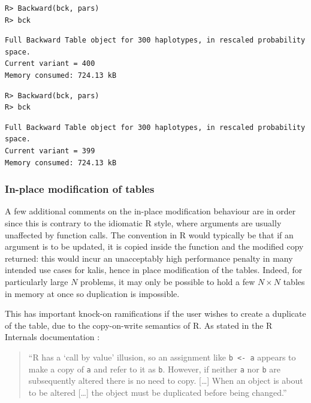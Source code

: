 \documentclass[a4paper]{article}
\let\proglang=\textsf
\newcommand{\pkg}[1]{{\fontseries{m}\fontseries{b}\selectfont #1}}
\begin{document}
\begin{verbatim}
R> Backward(bck, pars)
R> bck
\end{verbatim}
\begin{verbatim}
Full Backward Table object for 300 haplotypes, in rescaled probability space.
Current variant = 400
Memory consumed: 724.13 kB
\end{verbatim}
\begin{verbatim}
R> Backward(bck, pars)
R> bck
\end{verbatim}
\begin{verbatim}
Full Backward Table object for 300 haplotypes, in rescaled probability space.
Current variant = 399
Memory consumed: 724.13 kB
\end{verbatim}



\subsubsection*{In-place modification of tables}
\label{in-place-modification-of-tables}

A few additional comments on the in-place modification behaviour are in order since this is contrary to the idiomatic \proglang{R} style, where arguments are usually unaffected by function calls.
The convention in \proglang{R} would typically be that if an argument is to be updated, it is copied inside the function and the modified copy returned: this would incur an unacceptably high performance penalty in many intended use cases for \pkg{kalis}, hence in place modification of the tables.
Indeed, for particularly large \(N\) problems, it may only be possible to hold a few \(N \times N\) tables in memory at once so duplication is impossible.

This has important knock-on ramifications if the user wishes to create a duplicate of the table, due to the copy-on-write semantics of \proglang{R}.
As stated in the R Internals documentation \cite[\S1.1.2]{Rinternals}:

\begin{quote}
	``R has a `call by value' illusion, so an assignment like \texttt{b\ \textless{}-\ a} appears to make a copy of \texttt{a} and refer to it as \texttt{b}.
	However, if neither \texttt{a} nor \texttt{b} are subsequently altered there is no need to copy.
	{[}\ldots{]} When an object is about to be altered {[}\ldots{]} the object must be duplicated before being changed.''
\end{quote}
\end{document}
